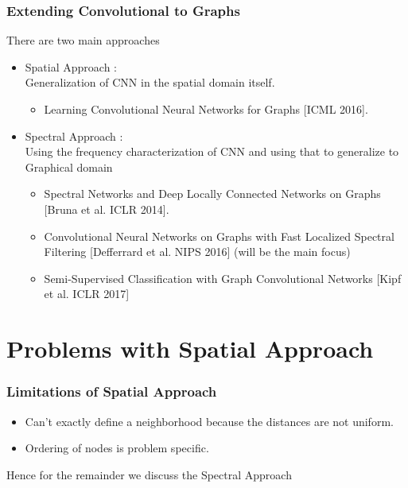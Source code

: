 \documentclass{beamer}
\begin{document}
\begin{frame}
  \frametitle{Extending Convolutional to Graphs}
  There are two main approaches
  \begin{itemize}
  \item <1->Spatial Approach :\\
    Generalization of CNN in the spatial domain itself.
    \begin{itemize}
    \item <2-> Learning Convolutional Neural Networks for Graphs [ICML 2016].\cite{DBLP:journals/corr/NiepertAK16}
    \end{itemize}
  \item <3-> Spectral Approach :\\
    Using the frequency characterization of CNN and using that to generalize to Graphical domain
    \begin{itemize}
    \item <4->Spectral Networks and Deep Locally Connected Networks on Graphs [Bruna et al. ICLR 2014]. %
    \item <4->Convolutional Neural Networks on Graphs with Fast Localized Spectral Filtering [Defferrard et al. NIPS 2016] (will be the main focus) %
    \item <4->Semi-Supervised Classification with Graph Convolutional Networks [Kipf et al. ICLR 2017] %
    \end{itemize}
  \end{itemize}
\end{frame}

\section{Problems with Spatial Approach}
\begin{frame}
  \frametitle{Limitations of Spatial Approach}
  \begin{itemize}
  \item Can't exactly define a neighborhood because the distances are not uniform.
  \item Ordering of nodes is problem specific.
  \end{itemize}
  Hence for the remainder we discuss the Spectral Approach
\end{frame}
\end{document}
